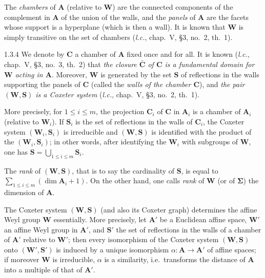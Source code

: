 \documentclass[12pt,a4paper,oneside,english]{smfart}
\makeatletter
\newcommand{\btanchor}[1]{\leavevmode\Hy@raisedlink{\hypertarget{bt:#1}{}}}
\theoremstyle{definition}
\theoremstyle{bt}
\makeatother
\begin{document}
The \emph{chambers} of $\mathbf{A}$ (relative to $\mathbf{W}$) are the connected components of the complement in $\mathbf{A}$ of the union of the walls, and the \emph{panels} of $\mathbf{A}$ are the facets whose support is a hyperplane (which is then a wall). It is known that $\mathbf{W}$ is simply transitive on the set of chambers (\emph{l.c.}, chap.~V, \S3, no.~2, th.~1).

\num{1.3.4}\btanchor{1.3.4} We denote by $\mathbf{C}$ a chamber of $\mathbf{A}$ fixed once and
for all. It is known (\emph{l.c.}, chap.~V, \S3, no.~3, th.~2) that
\emph{the closure $\bar{\mathbf{C}}$ of $\mathbf{C}$ is a fundamental domain
for $\mathbf{W}$ acting in $\mathbf{A}$}. Moreover, $\mathbf{W}$ is generated by the set $\mathbf{S}$ of reflections in the walls supporting the panels of $\mathbf{C}$ (called the \emph{walls of the chamber $\mathbf{C}$}), and
\emph{the pair $(\mathbf{W},\mathbf{S})$ is a Coxeter system} (\emph{l.c.},
chap.~V, \S3, no.~2, th.~1).

More precisely, for $1\leqslant i\leqslant m$, the projection $\mathbf{C}_i$ of $\mathbf{C}$ in $\mathbf{A}_i$ is a chamber of $\mathbf{A}_i$ (relative to $\mathbf{W}_i$). If $\mathbf{S}_i$ is the set of reflections in the walls of $\mathbf{C}_i$, the Coxeter system $(\mathbf{W}_i,\mathbf{S}_i)$ is irreducible and $(\mathbf{W},\mathbf{S})$ is identified with the product of the $(\mathbf{W}_i,\mathbf{S}_i)$; in other words, after identifying the $\mathbf{W}_i$ with subgroups of $\mathbf{W}$, one has $\mathbf{S}=\bigcup_{1\leqslant i\leqslant m}\mathbf{S}_i$.

The \emph{rank} of $(\mathbf{W},\mathbf{S})$, that is to say the cardinality of $\mathbf{S}$, is equal to $\sum_{1\leqslant i\leqslant m}(\dim\mathbf{A}_i+1)$. On the other hand, one calls \emph{rank} of $\mathbf{W}$ (or of $\boldsymbol{\Sigma}$) the dimension of $\mathbf{A}$.

The Coxeter system $(\mathbf{W},\mathbf{S})$ (and also its Coxeter graph) determines the affine Weyl group $\mathbf{W}$ essentially. More precisely, let $\mathbf{A}'$ be a Euclidean affine space, $\mathbf{W}'$ an affine Weyl group in $\mathbf{A}'$, and $\mathbf{S}'$ the set of reflections in the walls of a chamber of $\mathbf{A}'$ relative to $\mathbf{W}'$; then every isomorphism of the Coxeter system $(\mathbf{W},\mathbf{S})$ onto $(\mathbf{W}',\mathbf{S}')$ is induced by a unique isomorphism $\alpha:\mathbf{A}\rightarrow\mathbf{A}'$ of affine spaces; if moreover $\mathbf{W}$ is irreducible, $\alpha$ is a similarity, i.e.\ transforms the distance of $\mathbf{A}$ into a multiple of that of $\mathbf{A}'$.
\end{document}
